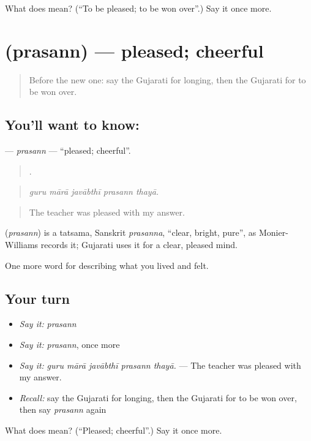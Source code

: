 \begin{tcolorbox}[breakable,colback=teal!4,colframe=teal!35!black,title={Before you move on}]
What does  mean? (\textquotedblleft{}To be pleased; to be won over\textquotedblright{}.) Say it once more.
\end{tcolorbox}
\section[\texorpdfstring{\gu{પ્રસન્ન} (prasann)}{પ્રસન્ન (prasann)}]{ (prasann) — pleased; cheerful}

\label{lesson:GU-C449-prasann}



\begin{quote}
Before the new one: say the Gujarati for longing, then the Gujarati for to be won over.
\end{quote}

\subsection*{You'll want to know: }
\textbf{} — \emph{prasann} — \textquotedblleft{}pleased; cheerful\textquotedblright{}.

\begin{quote}
    .
\end{quote}

\begin{quote}
\emph{guru mārā javābthī prasann thayā.}
\end{quote}

\begin{quote}
The teacher was pleased with my answer.
\end{quote}

\begin{cousinweb}
\textbf{} (\emph{prasann}) is a tatsama, Sanskrit \emph{prasanna}, \textquotedblleft{}clear, bright, pure\textquotedblright{}, as Monier-Williams records it; Gujarati uses it for a clear, pleased mind.
\end{cousinweb}

\begin{grammarlens}[title={What you've built}]
One more word for describing what you lived and felt.
\end{grammarlens}

\subsection*{Your turn}
\begin{itemize}
\raggedright
  \item \emph{Say it:} \emph{prasann}
  \item \emph{Say it:} \emph{prasann}, once more
  \item \emph{Say it:} \emph{guru mārā javābthī prasann thayā.} — The teacher was pleased with my answer.
  \item \emph{Recall:} say the Gujarati for longing, then the Gujarati for to be won over, then say \emph{prasann} again
\end{itemize}

\begin{tcolorbox}[breakable,colback=teal!4,colframe=teal!35!black,title={Before you move on}]
What does  mean? (\textquotedblleft{}Pleased; cheerful\textquotedblright{}.) Say it once more.
\end{tcolorbox}
